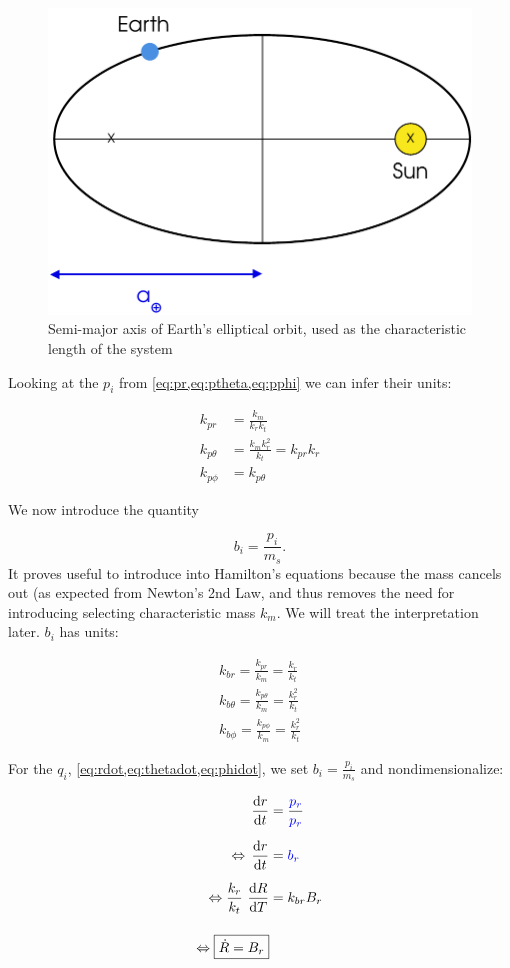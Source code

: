 \begin{figure}[ht]
    \centering
    \includegraphics[width=0.60\linewidth]{fig/earth-semi-major-axis}
    \caption{Semi-major axis of Earth's elliptical orbit, used as the characteristic length of the system}
    \label{fig:earth-semi-major-axis}
\end{figure}

Looking at the \(p_i\) from \cref{eq:pr,eq:ptheta,eq:pphi} we can infer their units:

\begin{align}
    k_{pr} &= \frac{k_m}{k_r k_t} \\[0.2cm]
    k_{p\theta} &= \frac{k_m k_r^2}{k_t} = k_{pr} k_r \\[0.2cm]
    k_{p\phi} &= k_{p\theta}
\end{align}

We now introduce the quantity

\begin{equation}
    b_i = \frac{p_i}{m_s}.
\end{equation}
It proves useful to introduce into Hamilton's equations because the mass cancels out (as expected from Newton's 2nd Law, and thus removes the need for introducing  selecting characteristic mass \(k_m\). We will treat the interpretation later. \(b_i\) has units:

\begin{align}
    k_{br} = \frac{k_{pr}}{k_m} = \frac{k_r}{k_t} \\[0.2cm]
    k_{b\theta} = \frac{k_{p\theta}}{k_m} = \frac{k_r^2}{k_t} \\[0.2cm]
    k_{b\phi} = \frac{k_{p\phi}}{k_m} = \frac{k_r^2}{k_t}
\end{align}

For the \(q_i\), \cref{eq:rdot,eq:thetadot,eq:phidot}, we set \(b_i = \frac{p_i}{m_s}\) and nondimensionalize:

\begin{align}
    \operatorname{}\frac{\mathrm{d} r}{\mathrm{d} t} &= \frac{\textcolor{blue}{p_r}}{\textcolor{blue}{p_r}} \\[0.2cm]
    \Leftrightarrow \operatorname{}\frac{\mathrm{d} r}{\mathrm{d} t} &= \textcolor{blue}{b_r} \\[0.2cm]
    \Leftrightarrow \frac{k_r}{k_t} \operatorname{}\frac{\mathrm{d} R}{\mathrm{d} T} &= k_{br} B_r \\[0.4cm]
    \Leftrightarrow \boxed{\dot{R} = B_r}
\end{align}

